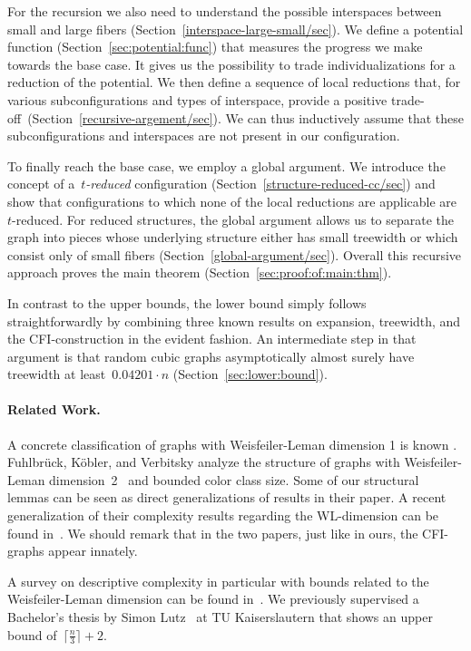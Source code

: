 \documentclass[english,a4paper]{article}
\theoremstyle{plain}
\theoremstyle{definition}
\begin{document}
For the recursion we also need to understand the possible interspaces between small and large fibers (Section~\ref{interspace-large-small/sec}).
We define a potential function (Section~\ref{sec:potential:func}) that measures the progress we make towards the base case. It gives us the possibility to trade individualizations for a reduction of the potential. We then define a sequence of local reductions that, for various subconfigurations and types of interspace, provide a positive trade-off~(Section~\ref{recursive-argement/sec}). We can thus inductively assume that these subconfigurations and interspaces are not present in our configuration.

To finally reach the base case, we employ a global argument. We introduce the concept of a~\emph{$t$-reduced} configuration (Section~\ref{structure-reduced-cc/sec}) and show that configurations to which none of the local reductions are applicable are~$t$-reduced.
For reduced structures, the global argument allows us to separate the graph into pieces whose underlying structure either has small treewidth or which consist only of small fibers (Section~\ref{global-argument/sec}).
Overall this recursive approach proves the main theorem (Section~\ref{sec:proof:of:main:thm}).

In contrast to the upper bounds, the lower bound simply follows straightforwardly by combining three known results on expansion, treewidth, and the CFI-construction in the evident fashion. An intermediate step in that argument is that  random cubic graphs asymptotically almost surely have treewidth at least~$0.04201\cdot n$ (Section~\ref{sec:lower:bound}).

\paragraph{Related Work.}  A concrete classification of graphs with Weisfeiler-Leman dimension 1 is known \cite{DBLP:journals/cc/ArvindKRV17,DBLP:journals/tocl/KieferSS22}.
Fuhlbr{\"{u}}ck, K{\"{o}}bler, and Verbitsky analyze the structure of
graphs with Weisfeiler-Leman dimension~2~\cite{DBLP:journals/siamdm/FuhlbruckKV21} and bounded color class size. Some of our structural lemmas can be seen as direct generalizations of results in their paper.
A recent generalization of their complexity results regarding the WL-dimension can be found in~\cite{DBLP:journals/corr/abs-2402-11531}. We should remark that in the two papers, just like in ours, the CFI-graphs appear innately.

A survey on descriptive complexity in particular with bounds related to the Weisfeiler-Leman dimension can be found in~\cite{DBLP:conf/asl/PikhurkoV09}. We previously supervised a Bachelor's thesis by Simon Lutz~\cite{Lutz2020BoundsWL} at TU Kaiserslautern that shows an upper bound of~$\lceil\frac{n}{3}\rceil+2$.
\end{document}
